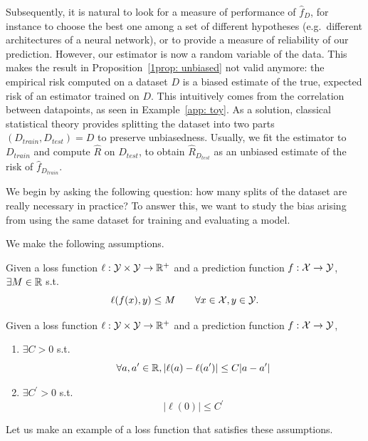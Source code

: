 \documentclass[reqno]{amsart}
\begin{document}
Subsequently, it is natural to look for a measure of performance of $\hat f_D$, for instance to choose the best one among a set of different hypotheses (e.g.\ different architectures of a neural network), or to provide a measure of reliability of our prediction. However, our estimator is now a random variable of the data. This makes the result in Proposition~\ref{1prop: unbiased} not valid anymore: the empirical risk computed on a dataset $D$ is a biased estimate of the true, expected risk of an estimator trained on $D$. This intuitively comes from the correlation between datapoints, as seen in Example~\ref{app: toy}. 
As a solution, classical statistical theory provides splitting the dataset into two parts $(D_{train},D_{test})=D$ to preserve unbiasedness. Usually, we fit the estimator to $D_{train}$ and compute $\hat R$ on $D_{test}$, to obtain $\hat R_{D_{test}}$ as an unbiased estimate of the risk of $\hat f_{D_{train}}$. 

We begin by asking the following question: how many splits of the dataset are really necessary in practice? To answer this, we want to study the bias arising from using the same dataset for training and evaluating a model. 

We make the following assumptions.

\begin{assumption}\label{ass: bounded loss}
    Given a loss function $\ell:\mathcal{Y}\times\mathcal{Y}\to\mathbb{R}^+$ and a prediction function $f:\mathcal{X}\to\mathcal{Y}$, 
    $\exists M\in\mathbb{R}$ s.t.
    \[
    \ell (f(x), y) \le M \qquad \forall x\in\mathcal{X}, y\in\mathcal{Y}.
    \]
\end{assumption}

\begin{assumption}\label{ass: lipsch loss}
Given a loss function $\ell:\mathcal{Y}\times\mathcal{Y}\to\mathbb{R}^+$ and a prediction function $f:\mathcal{X}\to\mathcal{Y}$, 
    \begin{enumerate}
        \item $\exists C>0$ s.t.
        \[ \forall a,a^\prime\in\mathbb{R}, \vert \ell(a)-\ell(a^\prime)\vert \le C\vert a-a^\prime\vert\]

        \item $\exists C^\prime >0$ s.t.
        \[ \vert \ell(0)\vert \le C^\prime
        \]
    \end{enumerate}
\end{assumption}

Let us make an example of a loss function that satisfies these assumptions.
\end{document}
